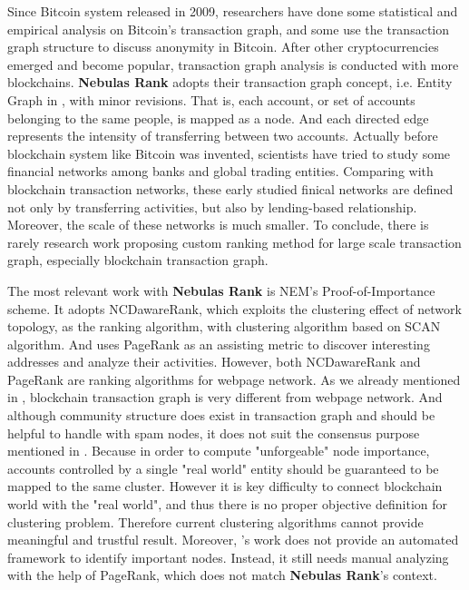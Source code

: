 Since Bitcoin\cite{Nakamoto2008} system released in 2009, researchers have done some statistical and empirical analysis on Bitcoin's transaction graph\cite{Ron}\cite{Haslhofer}\cite{NielKondor2014}\cite{Baumann2014}, and some use the transaction graph structure to discuss anonymity in Bitcoin\cite{Meiklejohn2013}\cite{Ober2013}\cite{pham2016anomaly}\cite{Fleder2015}\cite{Ferrin2015}. After other cryptocurrencies emerged and become popular, transaction graph analysis is conducted with more blockchains\cite{Chang2017}\cite{Anderson2016}. \textbf{Nebulas Rank} adopts their transaction graph concept, i.e. Entity Graph in \cite{Tschorsch2015}, with minor revisions. That is, each account, or set of accounts belonging to the same people, is mapped as a node. And each directed edge represents the intensity of transferring between two accounts. Actually before blockchain system like Bitcoin was invented, scientists have tried to study some financial networks among banks and global trading entities\cite{propper2008towards}\cite{Boss2004}\cite{Serrano2007}\cite{Bech2008}\cite{Fagiolo2009}\cite{Morten2006}\cite{Boss2004a}\cite{Krempel2002}\cite{Serrano2003}. Comparing with blockchain transaction networks, these early studied finical networks are defined not only by transferring activities, but also by lending-based relationship. Moreover, the scale of these networks is much smaller. To conclude, there is rarely research work proposing custom ranking method for large scale transaction graph, especially blockchain transaction graph.

The most relevant work with \textbf{Nebulas Rank} is NEM\cite{nem}'s Proof-of-Importance scheme. It adopts NCDawareRank\cite{Nikolakopoulos2013}, which exploits the clustering effect of network topology, as the ranking algorithm, with clustering algorithm based on SCAN algorithm\cite{xu2007scan}\cite{shiokawa2015scan}\cite{chang2017mathsf}. And \textcite{Fleder2015} uses PageRank\cite{Brin2010}\cite{page1999pagerank} as an assisting metric to discover interesting addresses and analyze their activities. However, both NCDawareRank and PageRank are ranking algorithms for webpage network. As we already mentioned in , blockchain transaction graph is very different from webpage network. And although community structure does exist in transaction graph and should be helpful to handle with spam nodes, it does not suit the consensus purpose mentioned in . Because in order to compute "unforgeable" node importance, accounts controlled by a single "real world" entity should be guaranteed to be mapped to the same cluster. However it is key difficulty to connect blockchain world with the "real world", and thus there is no proper objective definition for clustering problem. Therefore current clustering algorithms cannot provide meaningful and trustful result. Moreover, \cite{Fleder2015}'s work does not provide an automated framework to identify important nodes. Instead, it still needs manual analyzing with the help of PageRank, which does not match \textbf{Nebulas Rank}'s context.

